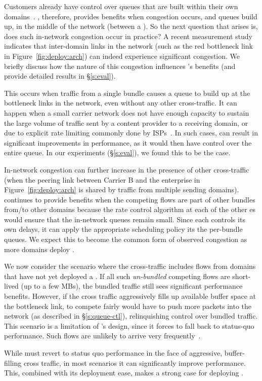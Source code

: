 Customers already have control over queues that are built within their own domains~\cite{swan, b4, bwe}. \name, therefore, provides benefits when congestion occurs, and queues build up, in the middle of the network (\ie between a \pair).  
So the next question that arises is, does such in-network congestion occur in practice? A recent measurement study~\cite{inferring-interdomain-congestion} indicates that inter-domain links in the network (such as the red bottleneck link in Figure~\ref{fig:deploy:arch}) can indeed experience significant congestion. 
We briefly discuss how the nature of this congestion influences \name's benefits (and provide detailed results in \S\ref{s:eval}). 

 This occurs when traffic from a single bundle causes a queue to build up at the bottleneck links in the network, even without any other cross-traffic. It can happen when a small carrier network does not have enough capacity to sustain the large volume of traffic sent by a content provider to a receiving domain, or due to explicit rate limiting commonly done by ISPs~\cite{isp-throttle-1, isp-throttle-2, isp-throttle-3}. In such cases, \name can result in
significant improvements in performance, as it would then have control over the entire queue. In our experiments (\S\ref{s:eval}), we found this to be the case.

 In-network congestion can further increase in the presence of other cross-traffic (\eg when the peering link between Carrier B and the enterprise in Figure~\ref{fig:deploy:arch} is shared by traffic from multiple sending domains). 
\name continues to provide benefits when the competing flows are part of other bundles from/to other domains because the rate control algorithm at each of the other {\inbox}es would ensure that the in-network queues remain small. Since each \inbox controls its own delays, it can apply the appropriate scheduling policy its the per-bundle queues.
We expect this to become the common form of observed congestion as more domains deploy \name. 

 We now consider the scenario where the cross-traffic includes flows from domains that have not yet deployed a \name. If all such \emph{un-bundled} competing flows are short-lived (up to a few MBs), the bundled traffic still sees significant performance benefits. 
However, if the cross traffic aggressively fills up available buffer space at the bottleneck link, to compete fairly \name would have to push more packets into the network (as described in \S\ref{s:queue-ctl}), relinquishing control over bundled traffic.
This scenario is a limitation of \name's design, since it forces \name to fall back to status-quo performance.
 Such flows are unlikely to arrive very frequently~\cite{caida-dataset}. 

\vspace{0.05in}
 While \name must revert to status quo performance in the face of aggressive, buffer-filling cross traffic, in most scenarios it can significantly improve performance.
This, combined with its deployment ease, makes a strong case for deploying \name. 
